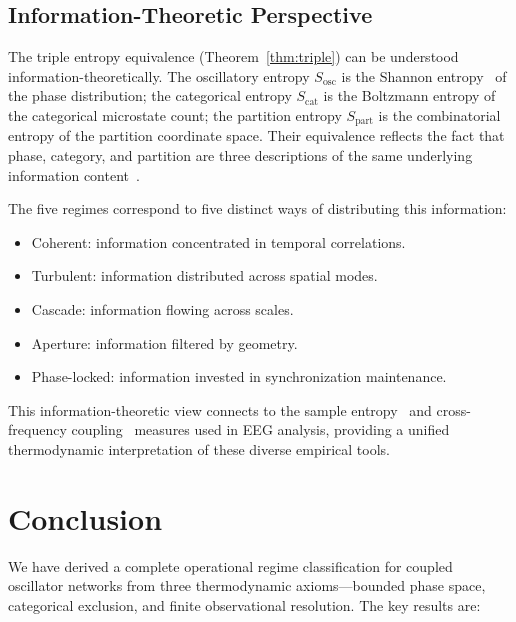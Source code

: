 \documentclass[aps,prd,twocolumn,superscriptaddress,floatfix,nofootinbib]{revtex4-2}
\theoremstyle{remark}
\newcommand{\Sosc}{S_{\mathrm{osc}}}
\newcommand{\Scat}{S_{\mathrm{cat}}}
\newcommand{\Spart}{S_{\mathrm{part}}}
\begin{document}
\subsection{Information-Theoretic Perspective}

The triple entropy equivalence (Theorem~\ref{thm:triple}) can be understood information-theoretically. The oscillatory entropy $\Sosc$ is the Shannon entropy~\cite{shannon1948mathematical} of the phase distribution; the categorical entropy $\Scat$ is the Boltzmann entropy of the categorical microstate count; the partition entropy $\Spart$ is the combinatorial entropy of the partition coordinate space. Their equivalence reflects the fact that phase, category, and partition are three descriptions of the same underlying information content~\cite{cover2006elements,jaynes1957information1}.

The five regimes correspond to five distinct ways of distributing this information:
\begin{itemize}
    \item Coherent: information concentrated in temporal correlations.
    \item Turbulent: information distributed across spatial modes.
    \item Cascade: information flowing across scales.
    \item Aperture: information filtered by geometry.
    \item Phase-locked: information invested in synchronization maintenance.
\end{itemize}

This information-theoretic view connects to the sample entropy~\cite{richman2000physiological} and cross-frequency coupling~\cite{canolty2010oscillatory} measures used in EEG analysis, providing a unified thermodynamic interpretation of these diverse empirical tools.

\section{Conclusion}
\label{sec:conclusion}

We have derived a complete operational regime classification for coupled oscillator networks from three thermodynamic axioms---bounded phase space, categorical exclusion, and finite observational resolution. The key results are:
\end{document}
